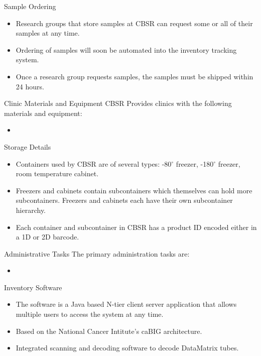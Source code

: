 \documentclass[hyperref={pdfpagelabels=false}]{beamer}
\begin{document}
\begin{frame}{Sample Ordering}
  \begin{itemize}
    \item Research groups that store samples at CBSR can request some or all of
      their samples at any time.
    \item Ordering of samples will soon be automated into the inventory
      tracking system.
    \item Once a research group requests samples, the samples must be shipped
      within 24 hours.
  \end{itemize}
\end{frame}

\begin{frame}{Clinic Materials and Equipment}{}
  CBSR Provides clinics with the following materials and equipment:
  \begin{itemize}
  \item
  \end{itemize}
\end{frame}

\begin{frame}{Storage Details}{}
  \begin{itemize}
  \item Containers used by CBSR are of several types: -80$^\circ$ freezer,
    -180$^\circ$ freezer, room temperature cabinet.
  \item Freezers and cabinets contain subcontainers which themselves can hold
    more subcontainers. Freezers and cabinets each have their own
    subcontainer hierarchy.
  \item Each container and subcontainer in CBSR has a product ID encoded either
    in a 1D or 2D barcode.
  \end{itemize}
\end{frame}

\begin{frame}{Administrative Tasks}
  The primary administration tasks are:
  \begin{itemize}
    \item
  \end{itemize}
\end{frame}

\begin{frame}{Inventory Software}
  \begin{itemize}
  \item The software is a Java based N-tier client server application that
    allows multiple users to access the system at any time.
  \item Based on the National Cancer Intitute's caBIG architecture.
  \item Integrated scanning and decoding software to decode DataMatrix tubes.
  \end{itemize}
\end{frame}
\end{document}
